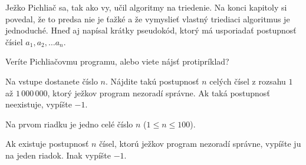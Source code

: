 




Ježko Pichliač sa, tak ako vy, učil algoritmy na triedenie. Na konci kapitoly si povedal, že to predsa
nie je ťažké a že vymyslieť vlastný triediaci algoritmus je jednoduché. Hneď aj napísal krátky
pseudokód, ktorý má usporiadať postupnosť čísiel $a_1, a_2, \dots a_n$.


Veríte Pichliačovmu programu, alebo viete nájsť protipríklad?


Na vstupe dostanete číslo $n$. Nájdite takú postupnosť $n$ celých čísel z rozsahu $1$ až
$1\,000\,000$, ktorý ježkov program nezoradí správne. Ak taká postupnosť neexistuje, vypíšte $-1$.


Na prvom riadku je jedno celé číslo $n$ ($1 \leq n \leq 100$).


Ak existuje postupnosť $n$ čísel, ktorú ježkov program nezoradí správne, vypíšte ju na jeden riadok.
Inak vypíšte $-1$.


\koniec


